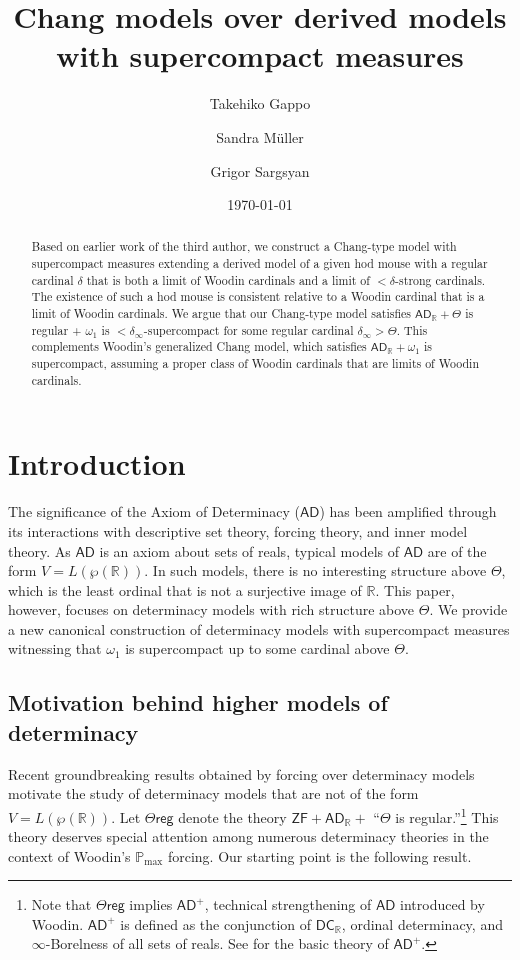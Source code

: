 \documentclass{amsart}
\title{Chang models over derived models with supercompact measures}
\author{Takehiko Gappo}
\author{Sandra M\"uller}
\author{Grigor Sargsyan}
\date{\today}
\newcommand{\power}{\wp}
\begin{document}
\maketitle

\begin{abstract}
Based on earlier work of the third author, we construct a Chang-type model with supercompact measures extending a derived model of a given hod mouse with a regular cardinal $\delta$ that is both a limit of Woodin cardinals and a limit of ${<}\delta$-strong cardinals.
The existence of such a hod mouse is consistent relative to a Woodin cardinal that is a limit of Woodin cardinals.
We argue that our Chang-type model satisfies $\mathsf{AD}_{\mathbb{R}} + \Theta$ is regular + $\omega_1$ is ${<}\delta_{\infty}$-supercompact for some regular cardinal $\delta_{\infty}>\Theta$.
This complements Woodin's generalized Chang model, which satisfies $\mathsf{AD}_{\mathbb{R}}+\omega_1$ is supercompact, assuming a proper class of Woodin cardinals that are limits of Woodin cardinals.
\end{abstract}

\section{Introduction}

The significance of the Axiom of Determinacy ($\mathsf{AD}$) has been amplified through its interactions with descriptive set theory, forcing theory, and inner model theory.
As $\mathsf{AD}$ is an axiom about sets of reals, typical models of $\mathsf{AD}$ are of the form $V=L(\power(\mathbb{R}))$.
In such models, there is no interesting structure above $\Theta$, which is the least ordinal that is not a surjective image of $\mathbb{R}$.
This paper, however, focuses on determinacy models with rich structure above $\Theta$.
We provide a new canonical construction of determinacy models with supercompact measures witnessing that $\omega_1$ is supercompact up to some cardinal above $\Theta$.

\subsection{Motivation behind higher models of determinacy}

Recent groundbreaking results obtained by forcing over determinacy models motivate the study of determinacy models that are not of the form $V=L(\power(\mathbb{R}))$.
Let $\Theta\mathsf{reg}$ denote the theory $\mathsf{ZF}+\mathsf{AD}_{\mathbb{R}}+$ ``$\Theta$ is regular.''\footnote{Note that $\Theta\mathsf{reg}$ implies $\mathsf{AD}^+$, technical strengthening of $\mathsf{AD}$ introduced by Woodin. $\mathsf{AD}^+$ is defined as the conjunction of $\mathsf{DC}_{\mathbb{R}}$, ordinal determinacy, and $\infty$-Borelness of all sets of reals. See \cite{ADplusbook} for the basic theory of $\mathsf{AD}^+$.}
This theory deserves special attention among numerous determinacy theories in the context of Woodin's $\mathbb{P}_{\mathrm{max}}$ forcing.
Our starting point is the following result.
\end{document}
